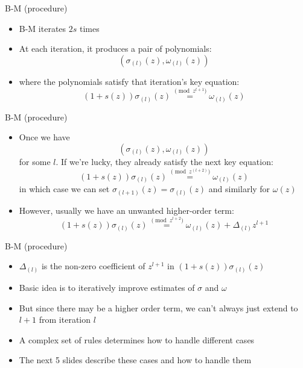 \documentclass[]{prosper}
\begin{document}
\begin{slide}{B-M (procedure)}
\begin{itemize}
    \item B-M iterates $2s$ times
    \item At each iteration, it produces a pair of polynomials:
    \[ (\sigma_{(l)}(z), \omega_{(l)}(z)) \]
    \item where the polynomials satisfy that iteration's key equation:
    \[ (1 + s(z)) \sigma_{(l)}(z) \stackrel{\pmod{z^{l+1}}}{=} \omega_{(l)}(z)  \]
\end{itemize}
\end{slide}

\begin{slide}{B-M (procedure)}
\begin{itemize}
    \item Once we have
    \[ (\sigma_{(l)}(z), \omega_{(l)}(z)) \]
    for some $l$. If we're lucky, they already satisfy the next key equation:
    \[ (1 + s(z)) \sigma_{(l)}(z) \stackrel{\pmod{z^{(l+2)}}}{=} \omega_{(l)}(z)  \]
    in which case we can set $\sigma_{(l+1)}(z) = \sigma_{(l)}(z)$ and similarly for $\omega(z)$
    \item However, usually we have an unwanted higher-order term:
    \[ (1 + s(z)) \sigma_{(l)}(z) \stackrel{\pmod {z^{l+2}}}{=} \omega_{(l)}(z) + \Delta_{(l)} z^{l+1}  \]
\end{itemize}
\end{slide}

\begin{slide}{B-M (procedure)}
\begin{itemize}
    \item $\Delta_{(l)}$ is the non-zero coefficient of $z^{l+1}$ in $(1 +s(z))\sigma_{(l)}(z)$
    \item Basic idea is to iteratively improve estimates of $\sigma$ and $\omega$
    \item But since there may be a higher order term, we can't always just extend to $l + 1$ from iteration $l$
    \item A complex set of rules determines how to handle different cases
    \item The next 5 slides describe these cases and how to handle them

\end{itemize}
\end{slide}
\end{document}
